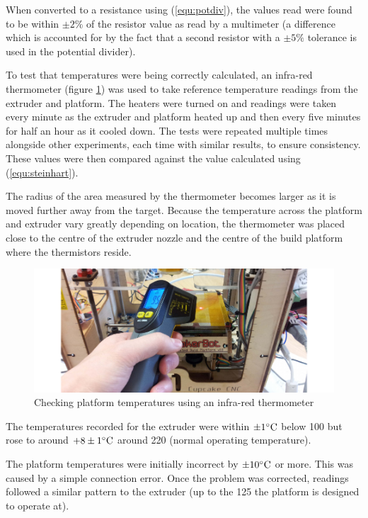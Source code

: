 		When converted to a resistance using (\ref{equ:potdiv}), the values read
		were found to be within $\pm2\%$ of the resistor value as read by a
		multimeter (a difference which is accounted for by the fact that a second
		resistor with a $\pm5\%$ tolerance is used in the potential divider).
		
		To test that temperatures were being correctly calculated, an infra-red
		thermometer (figure \ref{fig:thermometer}) was used to take reference
		temperature readings from the extruder and platform. The heaters were turned
		on and readings were taken every minute as the extruder and platform heated
		up and then every five minutes for half an hour as it cooled down.  The
		tests were repeated multiple times alongside other experiments, each time
		with similar results, to ensure consistency. These values were then compared
		against the value calculated using (\ref{equ:steinhart}). 
		
		The radius of the area measured by the thermometer becomes larger as it is
		moved further away from the target. Because the temperature across the
		platform and extruder vary greatly depending on location, the thermometer
		was placed close to the centre of the extruder nozzle and the centre of the
		build platform where the thermistors reside.
		
		\begin{figure}
			\includegraphics[width=1\textwidth]{diagrams/thermometer.pdf}
			\caption{Checking platform temperatures using an infra-red thermometer}
			\label{fig:thermometer}
		\end{figure}
		
		The temperatures recorded for the extruder were within $\pm1^\circ\textrm{C}$ below
		100\dC{} but rose to around $+8\pm1^\circ\textrm{C}$ around 220\dC{} (normal operating
		temperature).
		
		The platform temperatures were initially incorrect by $\pm10^\circ\textrm{C}$ or more.
		This was caused by a simple connection error. Once the problem was
		corrected, readings followed a similar pattern to the extruder (up to the
		125\dC{} the platform is designed to operate at).
		
